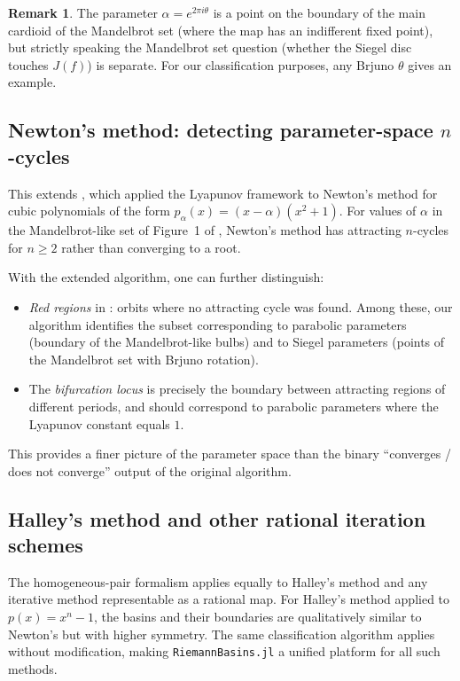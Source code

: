 \documentclass[12pt]{article}
\theoremstyle{definition}
\newtheorem{remark}[theorem]{Remark}
\begin{document}
\begin{remark}
  The parameter $\alpha = e^{2\pi i\theta}$ is a point on the boundary of
  the main cardioid of the Mandelbrot set (where the map has an
  indifferent fixed point), but strictly speaking the Mandelbrot set
  question (whether the Siegel disc touches $J(f)$) is separate.  For
  our classification purposes, any Brjuno $\theta$ gives an example.
\end{remark}

\subsection{Newton's method: detecting parameter-space $n$-cycles}

This extends \cite[\S6]{Alvarez2023}, which applied the Lyapunov
framework to Newton's method for cubic polynomials of the form
$p_\alpha(x) = (x-\alpha)(x^2+1)$.  For values of $\alpha$ in the
Mandelbrot-like set of Figure~1 of \cite{Alvarez2023}, Newton's method
has attracting $n$-cycles for $n \ge 2$ rather than converging to a root.

With the extended algorithm, one can further distinguish:
\begin{itemize}
  \item \emph{Red regions} in \cite[Fig.~2--3]{Alvarez2023}: orbits where
        no attracting cycle was found.  Among these, our algorithm
        identifies the subset corresponding to parabolic parameters
        (boundary of the Mandelbrot-like bulbs) and to Siegel parameters
        (points of the Mandelbrot set with Brjuno rotation).
  \item The \emph{bifurcation locus} is precisely the boundary between
        attracting regions of different periods, and should correspond to
        parabolic parameters where the Lyapunov constant equals $1$.
\end{itemize}
This provides a finer picture of the parameter space than the binary
``converges / does not converge'' output of the original algorithm.

\subsection{Halley's method and other rational iteration schemes}

The homogeneous-pair formalism applies equally to Halley's method and
any iterative method representable as a rational map.  For Halley's
method applied to $p(x) = x^n - 1$, the basins and their boundaries
are qualitatively similar to Newton's but with higher symmetry.  The
same classification algorithm applies without modification, making
\texttt{RiemannBasins.jl} a unified platform for all such methods.
\end{document}
